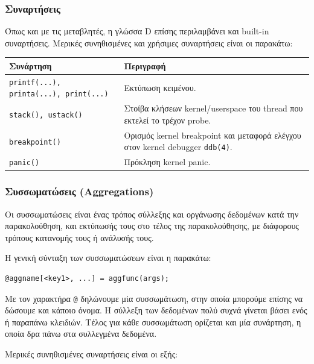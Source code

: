 \documentclass[12pt]{article}
\begin{document}
\subsubsection{Συναρτήσεις} \label{functions}

Όπως και με τις μεταβλητές, η γλώσσα D επίσης περιλαμβάνει και built-in
συναρτήσεις. Μερικές συνηθισμένες και χρήσιμες συναρτήσεις είναι οι παρακάτω:

\begin{center}
\begin{tabular}{|p{9cm}|p{9cm}|}
	\hline
	\textbf{Συνάρτηση} & \textbf{Περιγραφή} \\
	\hline
	\lstinline{printf(...), printa(...), print(...)} & Εκτύπωση κειμένου. \\
	\hline
	\lstinline{stack(), ustack()} & Στοίβα κλήσεων kernel/userspace του
		thread που εκτελεί το τρέχον probe. \\
	\hline
	\lstinline{breakpoint()} & Ορισμός kernel breakpoint και μεταφορά
		ελέγχου στον kernel debugger \lstinline{ddb(4)}. \\
	\hline
	\lstinline{panic()} & Πρόκληση kernel panic. \\
	\hline
\end{tabular}
\end{center}

\subsubsection{Συσσωματώσεις (Aggregations)}

Οι συσσωματώσεις είναι ένας τρόπος σύλλεξης και οργάνωσης δεδομένων κατά την
παρακολούθηση, και εκτύπωσής τους στο τέλος της παρακολούθησης, με διάφορους
τρόπους κατανομής τους ή ανάλυσής τους.

Η γενική σύνταξη των συσσωματώσεων είναι η παρακάτω:

\begin{lstlisting}
@aggname[<key1>, ...] = aggfunc(args);
\end{lstlisting}

Με τον χαρακτήρα \lstinline{@} δηλώνουμε μία συσσωμάτωση, στην οποία μπορούμε
επίσης να δώσουμε και κάποιο όνομα. Η σύλλεξη των δεδομένων πολύ συχνά γίνεται
βάσει ενός ή παραπάνω κλειδιών. Τέλος για κάθε συσσωμάτωση ορίζεται και μία
συνάρτηση, η οποία δρα πάνω στα συλλεγμένα δεδομένα.

Μερικές συνηθισμένες συναρτήσεις είναι οι εξής:
\end{document}
